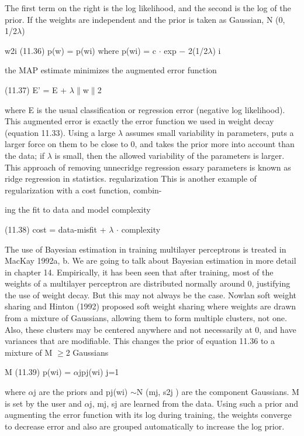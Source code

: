 The first term on the right is the log likelihood, and the second is the log of the prior. If the weights are independent and the prior is taken as Gaussian, N (0, 1/2$\lambda$)

w2i (11.36) p(w) = p(wi) where p(wi) = c $\cdot$ exp $-$ 2(1/2$\lambda$) i

the MAP estimate minimizes the augmented error function

(11.37) E' = E + $\lambda$$\parallel$w$\parallel$2

where E is the usual classification or regression error (negative log likelihood). This augmented error is exactly the error function we used in weight decay (equation 11.33). Using a large $\lambda$ assumes small variability in parameters, puts a larger force on them to be close to 0, and takes the prior more into account than the data; if $\lambda$ is small, then the allowed variability of the parameters is larger. This approach of removing unnecridge regression essary parameters is known as ridge regression in statistics. regularization This is another example of regularization with a cost function, combin-

ing the fit to data and model complexity

(11.38) cost = data-misfit + $\lambda$ $\cdot$ complexity

The use of Bayesian estimation in training multilayer perceptrons is treated in MacKay 1992a, b. We are going to talk about Bayesian estimation in more detail in chapter 14. Empirically, it has been seen that after training, most of the weights of a multilayer perceptron are distributed normally around 0, justifying the use of weight decay. But this may not always be the case. Nowlan soft weight sharing and Hinton (1992) proposed soft weight sharing where weights are drawn from a mixture of Gaussians, allowing them to form multiple clusters, not one. Also, these clusters may be centered anywhere and not necessarily at 0, and have variances that are modifiable. This changes the prior of equation 11.36 to a mixture of M $\geq$2 Gaussians

M (11.39) p(wi) = $\alpha$jpj(wi) j=1

where $\alpha$j are the priors and pj(wi) $\sim$N (mj, s2j ) are the component Gaussians. M is set by the user and $\alpha$j, mj, sj are learned from the data. Using such a prior and augmenting the error function with its log during training, the weights converge to decrease error and also are grouped automatically to increase the log prior.

